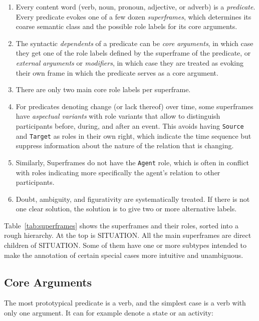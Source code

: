 \documentclass[a4paper]{article}
\newcommand{\fr}[1]{\textsf{#1}}
\begin{document}
\begin{enumerate}
    \item Every content word (verb, noun, pronoun, adjective, or adverb) is a
        \emph{predicate}. Every predicate evokes one of a few dozen
        \emph{superframes}, which determines its coarse semantic class and the
        possible role labels for its core arguments.
    \item The syntactic \emph{dependents} of a predicate can be
        \emph{core arguments}, in which case they get one of the role labels
        defined by the superframe of the predicate, or \emph{external
        arguments} or \emph{modifiers}, in which case they are treated as
        evoking their own frame in which the predicate serves as a core argument.
    \item There are only two main core role labels per superframe.
    \item For predicates denoting change (or lack thereof) over time,
        some superframes have \emph{aspectual variants} with role variants that
        allow to distinguish participants before, during, and after an event.
        This avoids having \texttt{Source} and \texttt{Target} as roles in
        their own right, which indicate the time sequence but suppress
        information about the nature of the relation that is changing.
    \item Similarly, Superframes do not have the \texttt{Agent} role, which is
        often in conflict with roles indicating more specifically the agent's
        relation to other participants.
    \item Doubt, ambiguity, and figurativity are systematically treated. If there
        is not one clear solution, the solution is to give two or more
        alternative labels.
\end{enumerate}

Table~\ref{tab:superframes} shows the superframes and their roles, sorted into
a rough hierarchy. At the top is \fr{SITUATION}. All the main superframes are
direct children of \fr{SITUATION}. Some of them have one or more subtypes
intended to make the annotation of certain special cases more intuitive and
unambiguous.


\newpage\subsection{Core Arguments}

The most prototypical predicate is a verb, and the simplest case is a verb with only one argument. It can for example denote a state or an activity:
\end{document}
